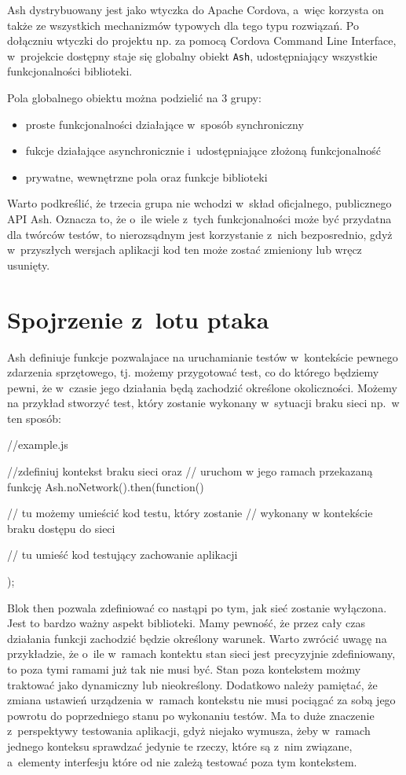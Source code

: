 \documentclass[brudnopis]{xmgr}
\begin{document}
Ash dystrybuowany jest jako wtyczka do Apache Cordova, a~więc korzysta on także ze wszystkich mechanizmów typowych dla tego typu rozwiązań. Po dołączniu wtyczki do projektu np. za pomocą Cordova Command Line Interface, w~projekcie dostępny staje się globalny obiekt \texttt{Ash}, udostępniający wszystkie funkcjonalności biblioteki. 

Pola globalnego obiektu można podzielić na 3 grupy:  
\begin{itemize}
  \item proste funkcjonalności działające w~sposób synchroniczny
  \item fukcje działające asynchronicznie i~udostępniające złożoną funkcjonalność 
  \item prywatne, wewnętrzne pola oraz funkcje biblioteki
\end{itemize}
Warto podkreślić, że trzecia grupa nie wchodzi w~skład oficjalnego, publicznego API Ash. Oznacza to, że o~ile wiele z~tych funkcjonalności może być przydatna dla twórców testów, to nierozsądnym jest korzystanie z~nich bezposrednio, gdyż w~przyszłych wersjach aplikacji kod ten może zostać zmieniony lub wręcz usunięty.

\section{Spojrzenie z~lotu ptaka}

Ash definiuje funkcje pozwalajace na uruchamianie testów w~kontekście pewnego zdarzenia sprzętowego, tj. możemy przygotować test, co do którego będziemy pewni, że w~czasie jego działania będą zachodzić określone okoliczności. Możemy na przykład stworzyć test, który zostanie wykonany w~sytuacji braku sieci np.~w ten sposób:

\begin{javascriptcode}
     //example.js

   //zdefiniuj kontekst braku sieci oraz 
   //  uruchom w jego ramach przekazaną funkcję
    Ash.noNetwork().then(function(){
	//  tu możemy umieścić kod testu, który zostanie 
         //    wykonany w kontekście braku dostępu do sieci 

	// tu umieść kod testujący zachowanie aplikacji  
    });
\end{javascriptcode}

Blok then pozwala zdefiniować co nastąpi po tym, jak sieć zostanie wyłączona. Jest to bardzo ważny aspekt biblioteki. Mamy pewność, że przez cały czas działania funkcji zachodzić będzie określony warunek. Warto zwrócić uwagę na przykładzie, że o~ile w~ramach kontektu stan sieci jest precyzyjnie zdefiniowany, to poza tymi ramami już tak nie musi być. Stan poza kontekstem możmy traktować jako dynamiczny lub nieokreślony. Dodatkowo należy pamiętać, że zmiana ustawień urządzenia w~ramach kontekstu nie musi pociągać za sobą jego powrotu do poprzedniego stanu po wykonaniu testów. Ma to duże znaczenie z~perspektywy testowania aplikacji, gdyż niejako wymusza, żeby w~ramach jednego konteksu sprawdzać jedynie te rzeczy, które są z~nim związane, a~elementy interfesju które od nie zależą testować poza tym kontekstem.
\end{document}
